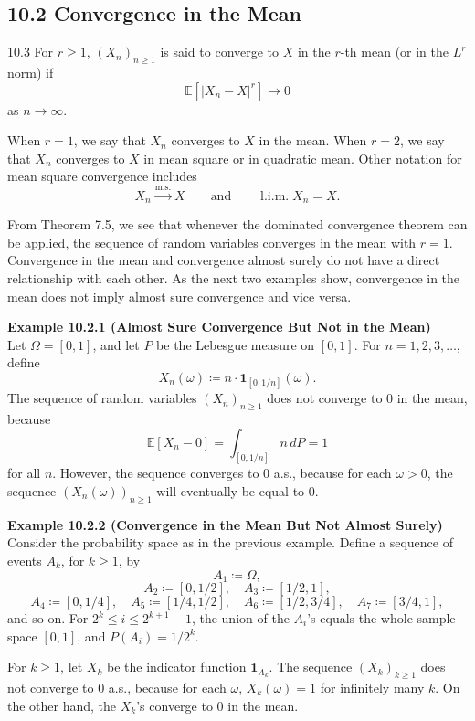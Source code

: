 \subsection*{10.2 Convergence in the Mean}

\begin{defbox}{10.3}
For $r\geq 1$, $(X_n)_{n\geq 1}$ is said to converge to $X$ in the $r$-th mean (or in the $L^r$ norm) if
\[
\mathbb{E}[\lvert X_n-X\rvert^r]\to 0
\]
as $n\to\infty$.

When $r=1$, we say that $X_n$ converges to $X$ in the mean. When $r=2$, we say that $X_n$ converges to $X$ in mean square or in quadratic mean. Other notation for mean square convergence includes
\[
X_n\xrightarrow{\mathrm{m.s.}}X
\qquad\text{and}\qquad
\operatorname{l.i.m.} X_n=X.
\]
\end{defbox}

From Theorem 7.5, we see that whenever the dominated convergence theorem can be applied, the sequence of random variables converges in the mean with $r=1$. Convergence in the mean and convergence almost surely do not have a direct relationship with each other. As the next two examples show, convergence in the mean does not imply almost sure convergence and vice versa.

\textbf{Example 10.2.1 (Almost Sure Convergence But Not in the Mean)} \\
Let $\Omega=[0,1]$, and let $P$ be the Lebesgue measure on $[0,1]$. For $n=1,2,3,\ldots$, define
\[
X_n(\omega)\coloneqq n\cdot \mathbf{1}_{[0,1/n]}(\omega).
\]
The sequence of random variables $(X_n)_{n\geq 1}$ does not converge to $0$ in the mean, because
\[
\mathbb{E}[X_n-0]=\int_{[0,1/n]}n\,dP=1
\]
for all $n$. However, the sequence converges to $0$ a.s., because for each $\omega>0$, the sequence $(X_n(\omega))_{n\geq 1}$ will eventually be equal to $0$.

\textbf{Example 10.2.2 (Convergence in the Mean But Not Almost Surely)} \\
Consider the probability space as in the previous example. Define a sequence of events $A_k$, for $k\geq 1$, by
\[
A_1\coloneqq \Omega,
\]
\[
A_2\coloneqq [0,1/2],\quad A_3\coloneqq [1/2,1],
\]
\[
A_4\coloneqq [0,1/4],\quad A_5\coloneqq [1/4,1/2],\quad
A_6\coloneqq [1/2,3/4],\quad A_7\coloneqq [3/4,1],
\]
and so on. For $2^k\leq i\leq 2^{k+1}-1$, the union of the $A_i$'s equals the whole sample space $[0,1]$, and $P(A_i)=1/2^k$.

For $k\geq 1$, let $X_k$ be the indicator function $\mathbf{1}_{A_k}$. The sequence $(X_k)_{k\geq 1}$ does not converge to $0$ a.s., because for each $\omega$, $X_k(\omega)=1$ for infinitely many $k$. On the other hand, the $X_k$'s converge to $0$ in the mean.

